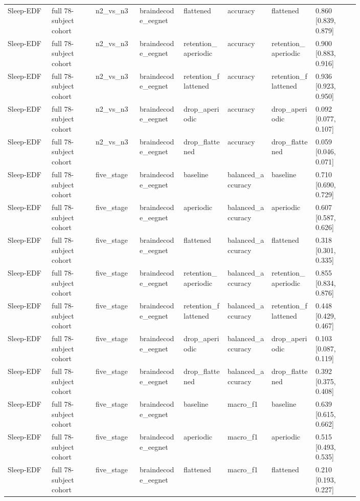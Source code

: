 \begin{longtable}{p{0.10\linewidth}p{0.10\linewidth}p{0.10\linewidth}p{0.10\linewidth}p{0.10\linewidth}p{0.10\linewidth}p{0.10\linewidth}p{0.10\linewidth}}
Sleep-EDF & full 78-subject cohort & n2\_vs\_n3 & braindecode\_eegnet & flattened & accuracy & flattened & 0.860 [0.839, 0.879]\\
Sleep-EDF & full 78-subject cohort & n2\_vs\_n3 & braindecode\_eegnet & retention\_aperiodic & accuracy & retention\_aperiodic & 0.900 [0.883, 0.916]\\
Sleep-EDF & full 78-subject cohort & n2\_vs\_n3 & braindecode\_eegnet & retention\_flattened & accuracy & retention\_flattened & 0.936 [0.923, 0.950]\\
Sleep-EDF & full 78-subject cohort & n2\_vs\_n3 & braindecode\_eegnet & drop\_aperiodic & accuracy & drop\_aperiodic & 0.092 [0.077, 0.107]\\
Sleep-EDF & full 78-subject cohort & n2\_vs\_n3 & braindecode\_eegnet & drop\_flattened & accuracy & drop\_flattened & 0.059 [0.046, 0.071]\\
Sleep-EDF & full 78-subject cohort & five\_stage & braindecode\_eegnet & baseline & balanced\_accuracy & baseline & 0.710 [0.690, 0.729]\\
Sleep-EDF & full 78-subject cohort & five\_stage & braindecode\_eegnet & aperiodic & balanced\_accuracy & aperiodic & 0.607 [0.587, 0.626]\\
Sleep-EDF & full 78-subject cohort & five\_stage & braindecode\_eegnet & flattened & balanced\_accuracy & flattened & 0.318 [0.301, 0.335]\\
Sleep-EDF & full 78-subject cohort & five\_stage & braindecode\_eegnet & retention\_aperiodic & balanced\_accuracy & retention\_aperiodic & 0.855 [0.834, 0.876]\\
Sleep-EDF & full 78-subject cohort & five\_stage & braindecode\_eegnet & retention\_flattened & balanced\_accuracy & retention\_flattened & 0.448 [0.429, 0.467]\\
Sleep-EDF & full 78-subject cohort & five\_stage & braindecode\_eegnet & drop\_aperiodic & balanced\_accuracy & drop\_aperiodic & 0.103 [0.087, 0.119]\\
Sleep-EDF & full 78-subject cohort & five\_stage & braindecode\_eegnet & drop\_flattened & balanced\_accuracy & drop\_flattened & 0.392 [0.375, 0.408]\\
Sleep-EDF & full 78-subject cohort & five\_stage & braindecode\_eegnet & baseline & macro\_f1 & baseline & 0.639 [0.615, 0.662]\\
Sleep-EDF & full 78-subject cohort & five\_stage & braindecode\_eegnet & aperiodic & macro\_f1 & aperiodic & 0.515 [0.493, 0.535]\\
Sleep-EDF & full 78-subject cohort & five\_stage & braindecode\_eegnet & flattened & macro\_f1 & flattened & 0.210 [0.193, 0.227]\\

\end{longtable}
